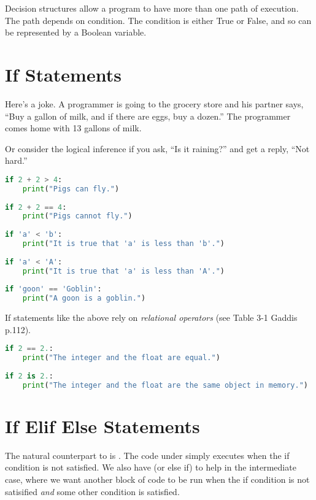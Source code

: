 \noindent {}

Decision structures allow a program to have more than one path of execution. The path depends on condition.
The condition is either True or False, and so can be represented by a Boolean variable.

\section{If Statements}

Here's a joke. A programmer is going to the grocery store and his partner says, ``Buy a gallon of milk, and if there are eggs, buy a dozen.''
The programmer comes home with 13 gallons of milk.

\smallskip
\noindent Or consider the logical inference if you ask, ``Is it raining?'' and get a reply, ``Not hard.''


\begin{lstlisting}[language = Python]
if 2 + 2 > 4:
    print("Pigs can fly.")
    
if 2 + 2 == 4:
    print("Pigs cannot fly.")
    
if 'a' < 'b':
    print("It is true that 'a' is less than 'b'.")
    
if 'a' < 'A':
    print("It is true that 'a' is less than 'A'.")
    
if 'goon' == 'Goblin':
    print("A goon is a goblin.") \end{lstlisting}
    

If statements like the above rely on \emph{relational operators} (see Table 3-1 Gaddis p.112).

\begin{lstlisting}[language = Python]
if 2 == 2.:
    print("The integer and the float are equal.")
    
if 2 is 2.:
    print("The integer and the float are the same object in memory.") \end{lstlisting}

\section{If Elif Else Statements}

The natural counterpart to  is . The code under  simply executes when the if condition is not satisfied. We also have  (or else if) to help in the intermediate case, where we want another block of code to be run when the if condition is not satisified \emph{and} some other condition is satisfied.

